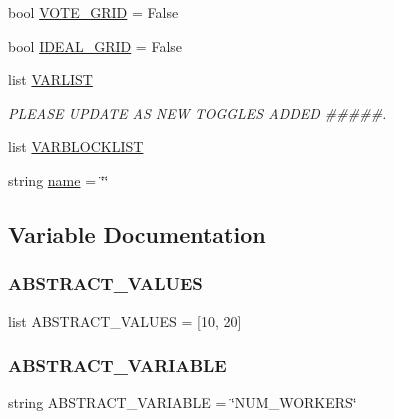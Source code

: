 \begin{DoxyCompactItemize}
\item 
bool \mbox{\hyperlink{namespacereorder_abd2acb6c03d6ca650537592475fc69e4}{V\+O\+T\+E\+\_\+\+G\+R\+ID}} = False
\item 
bool \mbox{\hyperlink{namespacereorder_a42311c82a77ac3b1c03bf7b9c6619be2}{I\+D\+E\+A\+L\+\_\+\+G\+R\+ID}} = False
\item 
list \mbox{\hyperlink{namespacereorder_abad4087652ccca08b33c499c7aad17b0}{V\+A\+R\+L\+I\+ST}}
\begin{DoxyCompactList}\small\item\em P\+L\+E\+A\+SE U\+P\+D\+A\+TE AS N\+EW T\+O\+G\+G\+L\+ES A\+D\+D\+ED \#\#\#\#\#. \end{DoxyCompactList}\item 
list \mbox{\hyperlink{namespacereorder_aa02a2d2c1773074f98b23ad1078b99da}{V\+A\+R\+B\+L\+O\+C\+K\+L\+I\+ST}}
\item 
string \mbox{\hyperlink{namespacereorder_a8ccf841cb59e451791bcb2e1ac4f1edc}{name}} = \char`\"{}\char`\"{}
\end{DoxyCompactItemize}


\subsection{Variable Documentation}
\mbox{\label{namespacereorder_ab64c8432c11e4b89425ac1f220ca01a9}} 
\subsubsection{\texorpdfstring{A\+B\+S\+T\+R\+A\+C\+T\+\_\+\+V\+A\+L\+U\+ES}{ABSTRACT\_VALUES}}
{\footnotesize\ttfamily list A\+B\+S\+T\+R\+A\+C\+T\+\_\+\+V\+A\+L\+U\+ES = \mbox{[}10, 20\mbox{]}}

\mbox{\label{namespacereorder_a05ba5c39ee5a05284597d091b01650a3}} 
\subsubsection{\texorpdfstring{A\+B\+S\+T\+R\+A\+C\+T\+\_\+\+V\+A\+R\+I\+A\+B\+LE}{ABSTRACT\_VARIABLE}}
{\footnotesize\ttfamily string A\+B\+S\+T\+R\+A\+C\+T\+\_\+\+V\+A\+R\+I\+A\+B\+LE = \char`\"{}N\+U\+M\+\_\+\+W\+O\+R\+K\+E\+RS\char`\"{}}


